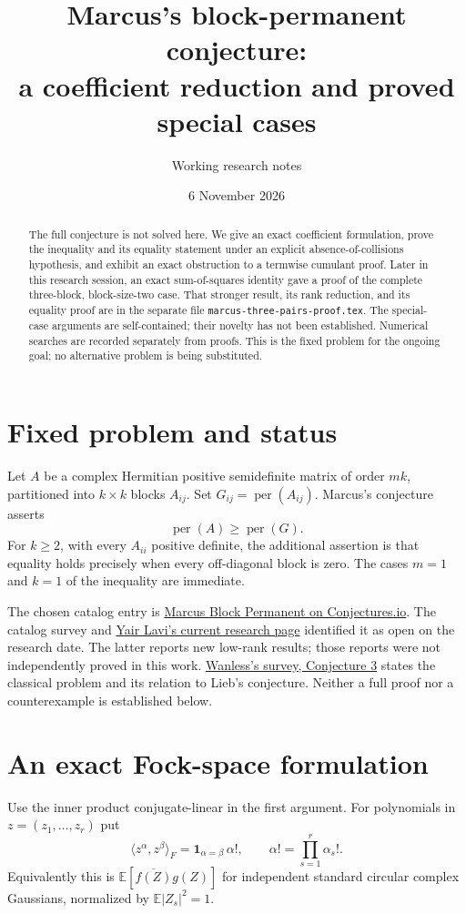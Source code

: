 \documentclass[11pt]{article}
\title{Marcus's block-permanent conjecture:\\a coefficient reduction and proved special cases}
\author{Working research notes}
\date{6 November 2026}
\newcommand{\per}{\operatorname{per}}
\begin{document}
\maketitle
\begin{abstract}
The full conjecture is not solved here. We give an exact coefficient formulation,
prove the inequality and its equality statement under an explicit absence-of-collisions
hypothesis, and exhibit an exact obstruction to a termwise cumulant proof.
Later in this research session, an exact sum-of-squares identity gave a proof
of the complete three-block, block-size-two case. That stronger result, its
rank reduction, and its equality proof are in the separate file
\texttt{marcus-three-pairs-proof.tex}.
The special-case arguments are self-contained; their novelty has not been established.
Numerical searches are recorded separately from proofs. This is the fixed problem
for the ongoing goal; no alternative problem is being substituted.
\end{abstract}

\section{Fixed problem and status}
Let $A$ be a complex Hermitian positive semidefinite matrix of order $mk$,
partitioned into $k\times k$ blocks $A_{ij}$. Set $G_{ij}=\per(A_{ij})$.
Marcus's conjecture asserts
\begin{equation}\label{goal}
 \per(A)\geq\per(G).
\end{equation}
For $k\geq2$, with every $A_{ii}$ positive definite, the additional assertion is
that equality holds precisely when every off-diagonal block is zero.
The cases $m=1$ and $k=1$ of the inequality are immediate.

The chosen catalog entry is
\href{https://conjectures.io/problems/fulloldproblemscatalog-marcusblockpermanent-conjecture}{Marcus Block Permanent on Conjectures.io}.
The catalog survey and
\href{https://yair-lavi.com/mincs-list/conjecture-9/index.html}{Yair Lavi's current research page}
identified it as open on the research date. The latter reports new low-rank
results; those reports were not independently proved in this work.
\href{https://arxiv.org/html/2202.01867v1}{Wanless's survey, Conjecture 3}
states the classical problem and its relation to Lieb's conjecture.
Neither a full proof nor a counterexample is established below.

\section{An exact Fock-space formulation}
Use the inner product conjugate-linear in the first argument. For polynomials in
$z=(z_1,\ldots,z_r)$ put
\[
 \langle z^\alpha,z^\beta\rangle_F
   =\mathbf1_{\alpha=\beta}\,\alpha!,\qquad
 \alpha!=\prod_{s=1}^r\alpha_s!.
\]
Equivalently this is $\mathbb E[\overline{f(Z)}g(Z)]$ for independent standard
circular complex Gaussians, normalized by $\mathbb E|Z_s|^2=1$.
\end{document}
